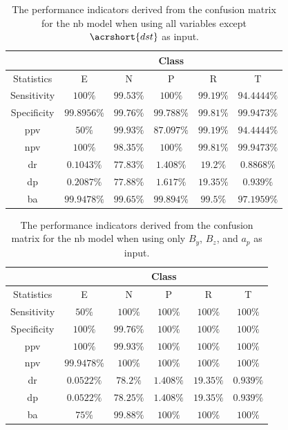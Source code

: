 \documentclass[sn-mathphys-num]{sn-jnl}%
\begin{document}
\begin{table}[!ht]
    \centering
    \caption{The performance indicators derived from the confusion matrix for the \acrlong{nb} model when using all variables except $\acrshort{dst}$ as input.}
	\label{tab:cs:reverse:no_DisturbanceStormTime:nb}
	\begin{tabular}{|c|c|c|c|c|c|}
		\hline
		 & \multicolumn{5}{c|}{Class} \\ \hline
		Statistics & E & N & P & R & T \\ \hline
		Sensitivity & $100\%$ & $99.53\%$ & $100\%$ & $99.19\%$ & $94.4444\%$ \\ \hline
		Specificity & $99.8956\%$ & $99.76\%$ & $99.788\%$ & $99.81\%$ & $99.9473\%$ \\ \hline
		\acrshort{ppv} & $50\%$ & $99.93\%$ & $87.097\%$ & $99.19\%$ & $94.4444\%$ \\ \hline
		\acrshort{npv} & $100\%$ & $98.35\%$ & $100\%$ & $99.81\%$ & $99.9473\%$ \\ \hline
		\acrshort{dr} & $0.1043\%$ & $77.83\%$ & $1.408\%$ & $19.2\%$ & $0.8868\%$ \\ \hline
		\acrshort{dp} & $0.2087\%$ & $77.88\%$ & $1.617\%$ & $19.35\%$ & $0.939\%$ \\ \hline
		\acrshort{ba} & $99.9478\%$ & $99.65\%$ & $99.894\%$ & $99.5\%$ & $97.1959\%$ \\ \hline
	\end{tabular}
\end{table}

\begin{table}[!ht]
    \centering
    \caption{The performance indicators derived from the confusion matrix for the \acrlong{nb} model when using only $B_{y}$, $B_{z}$, and $a_{p}$ as input.}
	\label{tab:cs:reverse:yzap:nb}
	\begin{tabular}{|c|c|c|c|c|c|}
		\hline
		 & \multicolumn{5}{c|}{Class} \\ \hline
		Statistics & E & N & P & R & T \\ \hline
		Sensitivity & $50\%$ & $100\%$ & $100\%$ & $100\%$ & $100\%$ \\ \hline
		Specificity & $100\%$ & $99.76\%$ & $100\%$ & $100\%$ & $100\%$ \\ \hline
		\acrshort{ppv} & $100\%$ & $99.93\%$ & $100\%$ & $100\%$ & $100\%$ \\ \hline
		\acrshort{npv} & $99.9478\%$ & $100\%$ & $100\%$ & $100\%$ & $100\%$ \\ \hline
		\acrshort{dr} & $0.0522\%$ & $78.2\%$ & $1.408\%$ & $19.35\%$ & $0.939\%$ \\ \hline
		\acrshort{dp} & $0.0522\%$ & $78.25\%$ & $1.408\%$ & $19.35\%$ & $0.939\%$ \\ \hline
		\acrshort{ba} & $75\%$ & $99.88\%$ & $100\%$ & $100\%$ & $100\%$ \\ \hline
	\end{tabular}
\end{table}
\end{document}
